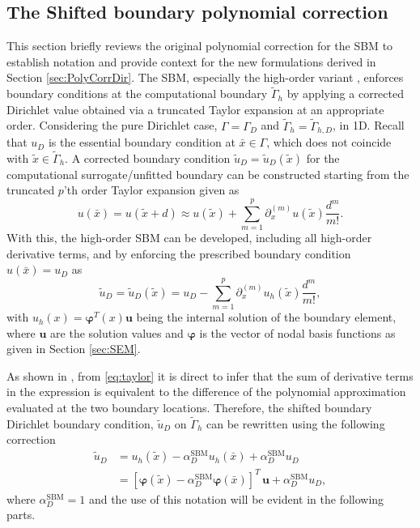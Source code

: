 \documentclass{article}
\renewcommand{\phi}{\varphi}
\begin{document}
\subsection{The Shifted boundary polynomial correction}\label{sec:SBcorrection}
This section briefly reviews the original polynomial correction for the SBM \cite{ciallella2023shifted} to establish notation and provide context for the new formulations derived in Section \ref{sec:PolyCorrDir}. The SBM, especially the high-order variant \cite{atallah2022high}, enforces boundary conditions at the computational boundary $\tilde{\Gamma}_h$ by applying a corrected Dirichlet value obtained via a truncated Taylor expansion at an appropriate order. Considering the pure Dirichlet case, $\Gamma = \Gamma_D$ and $\tilde{\Gamma}_h = \tilde{\Gamma}_{h,D}$, in 1D. Recall that $u_D$ is the essential boundary condition at $\bar{x} \in \Gamma$, which does not coincide with $\tilde x \in \tilde{\Gamma}_h$. A corrected boundary condition $\tilde{u}_D = \tilde{u}_D(\tilde x)$ for the computational surrogate/unfitted boundary can be constructed starting from the truncated $p$'th order Taylor expansion given as
%
\begin{equation}\label{eq:taylor}
    u(\bar x)=u(\tilde x + d) \approx u(\tilde x) + \sum_{m=1}^p \partial_x^{(m)} u(\tilde x) \frac{d^m}{m!}.
\end{equation}
%
With this, the high-order SBM \cite{atallah2022high} can be developed, including all high-order derivative terms, and by enforcing the prescribed boundary condition $u(\bar x) = u_D$ as
%
\begin{equation}
    \tilde{u}_D = \tilde{u}_D(\tilde x) = u_D - \sum_{m=1}^p \partial_x^{(m)} u_h(\tilde x) \frac{d^m}{m!},  
\end{equation}
%
with $u_h(x) = \boldsymbol{\phi}^T(x)\boldsymbol{u}$ being the internal solution of the boundary element, where $\boldsymbol{u}$ are the solution values and $\boldsymbol{\phi}$ is the vector of nodal basis functions as given in Section \ref{sec:SEM}.

As shown in \cite{ciallella2023shifted}, from \eqref{eq:taylor} it is direct to infer that the sum of derivative terms in the expression is equivalent to the difference of the polynomial approximation evaluated at the two boundary locations. Therefore, the shifted boundary Dirichlet boundary condition, $\tilde u_D$ on $\tilde{\Gamma}_h$ can be rewritten using the following correction
%
\begin{equation}\label{eq:SBcorrection}
\begin{split}
    \tilde{u}_D   &= u_h(\tilde x) - \alpha_D^{\text{SBM}}u_h(\bar x) + \alpha_D^{\text{SBM}}u_D \\
                  &= [\boldsymbol{\phi}(\tilde x) - \alpha_D^{\text{SBM}}\boldsymbol{\phi}(\bar x)]^T\, \boldsymbol{u} + \alpha_D^{\text{SBM}}u_D,
\end{split}
\end{equation}
where $\alpha_D^{\text{SBM}} = 1$ and the use of this notation will be evident in the following parts.
\end{document}
